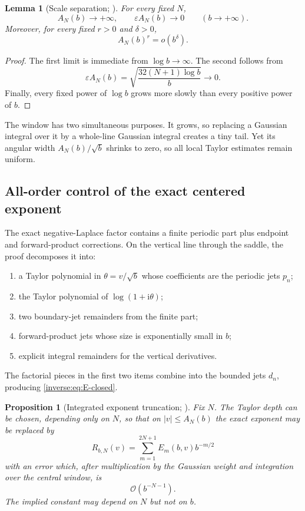 \documentclass[11pt,oneside]{article}
\newtheorem{proposition}[proposition]{Proposition}
\newtheorem{lemma}[lemma]{Lemma}
\theoremstyle{definition}
\theoremstyle{remark}
\newcommand{\ii}{\mathrm i}
\newcommand{\bigO}{\mathcal O}
\begin{document}
\begin{lemma}[Scale separation; \Formalized]
\label{inverse:lem:central-scale}
For every fixed $N$,
\[
 A_N(b)\longrightarrow+\infty,\qquad
 \varepsilon A_N(b)\longrightarrow0
 \qquad(b\to+\infty).
\]
Moreover, for every fixed $r>0$ and $\delta>0$,
\[
 A_N(b)^r=o(b^\delta).
\]
\end{lemma}

\begin{proof}
The first limit is immediate from $\log b\to\infty$.  The second follows
from
\[
 \varepsilon A_N(b)
 =\sqrt{\frac{32(N+1)\log b}{b}}\longrightarrow0.
\]
Finally, every fixed power of $\log b$ grows more slowly than every
positive power of $b$.
\end{proof}

The window has two simultaneous purposes.  It grows, so replacing a
Gaussian integral over it by a whole-line Gaussian integral creates a
tiny tail.  Yet its angular width
$A_N(b)/\sqrt b$ shrinks to zero, so all local Taylor estimates remain
uniform.

\subsection{All-order control of the exact centered exponent}

The exact negative-Laplace factor contains a finite periodic part plus
endpoint and forward-product corrections.  On the vertical line through
the saddle, the proof decomposes it into:
\begin{enumerate}
\item a Taylor polynomial in $\theta=v/\sqrt b$ whose coefficients are
the periodic jets $p_n$;
\item the Taylor polynomial of $\log(1+\ii\theta)$;
\item two boundary-jet remainders from the finite part;
\item forward-product jets whose size is exponentially small in $b$;
\item explicit integral remainders for the vertical derivatives.
\end{enumerate}
The factorial pieces in the first two items combine into the bounded
jets $d_n$, producing \eqref{inverse:eq:E-closed}.

\begin{proposition}[Integrated exponent truncation; \Formalized]
\label{inverse:prop:exponent-truncation}
Fix $N$.  The Taylor depth can be chosen, depending only on $N$, so that
on $|v|\leq A_N(b)$ the exact exponent may be replaced by
\[
 R_{b,N}(v)
 =\sum_{m=1}^{2N+1}E_m(b,v)b^{-m/2}
\]
with an error which, after multiplication by the Gaussian weight and
integration over the central window, is
\[
 \bigO(b^{-N-1}).
\]
The implied constant may depend on $N$ but not on $b$.
\end{proposition}
\end{document}
